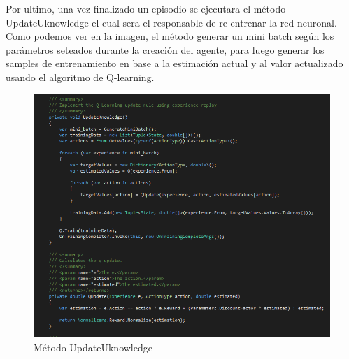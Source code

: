 Por ultimo, una vez finalizado un episodio se ejecutara el método UpdateUknowledge el cual sera el responsable de re-entrenar la red neuronal. Como podemos ver en la imagen, el método generar un mini batch según los parámetros seteados durante la creación del agente, para luego generar los samples de entrenamiento en base a la estimación actual y al valor actualizado usando el algoritmo de Q-learning.
\begin{figure}[h!]
	\centering
	\includegraphics[scale=0.7]{imagenes/screen8.png}
	\caption{Método UpdateUknowledge}
\end{figure}
